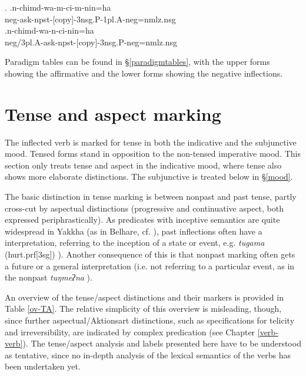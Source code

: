  \ex. \ag.n-chimd-wa-m-ci-m-nin=ha\\
			{\sc neg-}ask{\sc -npst-[copy]-3nsg.P-1pl.A-neg=nmlz.nsg}\\
 	\bg.n-chimd-wa-n-ci-nin=ha\\
		{\sc neg/3pl.A-}ask{\sc -npst-[copy]-3nsg.P-neg=nmlz.nsg}\\
		
Paradigm tables can be found in §\ref{paradigmtables}, with the upper forms showing the affirmative and the lower forms showing the negative inflections. 	


\section{Tense and aspect marking }\label{tense}

The inflected verb is marked  for tense in both the indicative and the subjunctive mood. Tensed forms stand in opposition to the non-tensed imperative mood. This section only treats tense and aspect in the indicative mood, where tense also shows more elaborate distinctions. The subjunctive is treated below in §\ref{mood}.

The basic distinction in tense marking is between nonpast and past tense, partly cross-cut by aspectual distinctions (progressive and continuative aspect, both expressed periphrastically). As predicates with inceptive semantics are quite wide\-spread in Yakkha (as in Belhare, cf. \citealt{Bickel1996Aspect}), past inflections often have a  interpretation, referring to the inception of a state or event, e.g. \emph{tugama}  (hurt.{\sc prf[3sg]}) ). Another consequence of this is that nonpast marking often gets a future  or a general interpretation (i.e. not referring to a particular event, as in  the nonpast \emph{tuŋmeʔna} ). 

An overview of the tense/aspect distinctions and their markers is provided in Table \ref{ov-TA}. The relative simplicity of this overview is misleading, though, since further aspectual/Aktionsart distinctions, such as  specifications for telicity and irreversibility, are indicated by  complex predication (see Chapter \ref{verb-verb}). The tense/aspect analysis and labels presented here have to be understood as tentative, since no in-depth analysis of the lexical semantics of the verbs has been undertaken yet.


